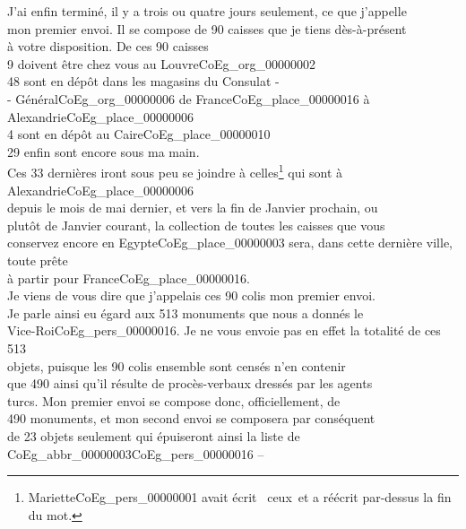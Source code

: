 \documentclass{book}
\begin{document}
\indent J’ai enfin terminé, il y a trois ou quatre jours seulement, ce que j’appelle\\
mon premier envoi. Il se compose de 90 caisses que je tiens dès-à-présent\\
à votre disposition. De ces 90 caisses\\
\hspace*{2cm} 9 doivent être chez vous au Louvre\gls{CoEg_org_00000002}\\
\hspace*{2cm} 48 sont en dépôt dans les magasins du Consulat -\\
\hspace*{4cm} - Général\gls{CoEg_org_00000006} de France\gls{CoEg_place_00000016} à Alexandrie\gls{CoEg_place_00000006}\\
\hspace*{2cm} 4 sont en dépôt au Caire\gls{CoEg_place_00000010}\\
\hspace*{2cm} 29 enfin sont encore sous ma main.\\
\indent Ces 33 dernières iront sous peu se joindre à celles\footnote{Mariette\gls{CoEg_pers_00000001} avait écrit \og ~ceux~\fg et a réécrit par-dessus la fin du mot.} qui sont à Alexandrie\gls{CoEg_place_00000006}\\
depuis le mois de mai dernier, et vers la fin de Janvier prochain, ou\\
plutôt de Janvier courant, la collection de toutes les caisses que vous\\
conservez encore en Egypte\gls{CoEg_place_00000003} sera, dans cette dernière ville, toute prête\\
à partir pour France\gls{CoEg_place_00000016}.\\
\indent Je viens de vous dire que j’appelais ces 90 colis mon premier envoi.\\
Je parle ainsi eu égard aux 513 monuments que nous a donnés le\\
Vice-Roi\gls{CoEg_pers_00000016}. Je ne vous envoie pas en effet la totalité de ces 513\\
objets, puisque les 90 colis ensemble sont censés n’en contenir\\
que 490 ainsi qu’il résulte de procès-verbaux dressés par les agents\\
turcs. Mon premier envoi se compose donc, officiellement, de\\
490 monuments, et mon second envoi se composera par conséquent\\
de 23 objets seulement qui épuiseront ainsi la liste de \gls{CoEg_abbr_00000003}\gls{CoEg_pers_00000016} –\\
\end{document}
